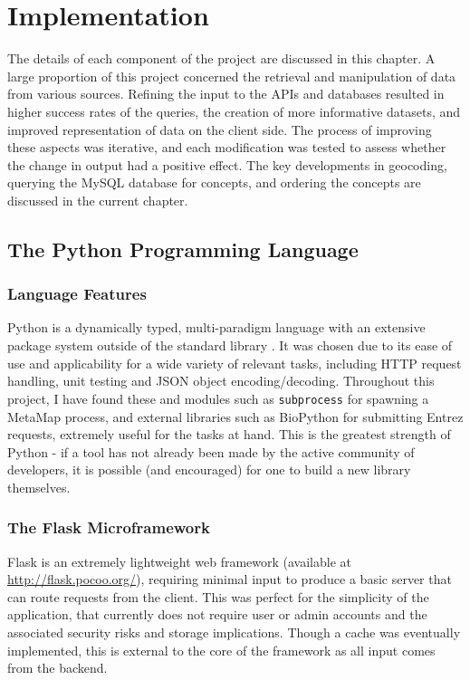 \documentclass[Report.tex]{subfiles}
\begin{document}
\chapter{Implementation}
The details of each component of the project are discussed in this chapter. A large proportion of this project concerned the retrieval and manipulation of data from various sources. Refining the input to the APIs and databases resulted in higher success rates of the queries, the creation of more informative datasets, and improved representation of data on the client side. The process of improving these aspects was iterative, and each modification was tested to assess whether the change in output had a positive effect. The key developments in geocoding, querying the MySQL database for concepts, and ordering the concepts are discussed in the current chapter.

\section{The Python Programming Language}
\subsection{Language Features}
Python is a dynamically typed, multi-paradigm language with an extensive package system outside of the standard library \cite{pythonabout}.  It was chosen due to its ease of use and applicability for a wide variety of relevant tasks, including HTTP request handling, unit testing and JSON object encoding/decoding. Throughout this project, I have found these and modules such as \texttt{subprocess} for spawning a MetaMap process, and external libraries such as BioPython for submitting Entrez requests, extremely useful for the tasks at hand. This is the greatest strength of Python - if a tool has not already been made by the active community of developers, it is possible (and encouraged) for one to build a new library themselves.

\subsection{The Flask Microframework}
Flask is an extremely lightweight web framework (available at \url{http://flask.pocoo.org/}), requiring minimal input to produce a basic server that can route requests from the client. This was perfect for the simplicity of the application, that currently does not require user or admin accounts and the associated security risks and storage implications. Though a cache was eventually implemented, this is external to the core of the framework as all input comes from the backend.
\end{document}
